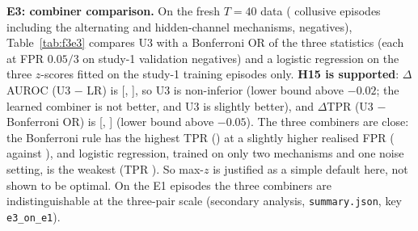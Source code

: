 \documentclass[11pt]{article}
\begin{document}
\textbf{E3: combiner comparison.} On the fresh $T{=}40$ data (\fEthreePos{} collusive episodes including the alternating and hidden-channel mechanisms, \fEthreeNeg{} negatives), Table~\ref{tab:f3e3} compares U3 with a Bonferroni OR of the three statistics (each at FPR $0.05/3$ on study-1 validation negatives) and a logistic regression on the three $z$-scores fitted on the \fEthreeLRTrain{} study-1 training episodes only. \textbf{H15 is supported}: $\Delta$AUROC (U3 $-$ LR) is \fEthreeDAuroc{} [\fEthreeDAurocLo{}, \fEthreeDAurocHi{}], so U3 is non-inferior (lower bound above $-0.02$; the learned combiner is not better, and U3 is slightly better), and $\Delta$TPR (U3 $-$ Bonferroni OR) is \fEthreeDTprBonf{} [\fEthreeDTprBonfLo{}, \fEthreeDTprBonfHi{}] (lower bound above $-0.05$). The three combiners are close: the Bonferroni rule has the highest TPR (\fEthreeTprBonf{}) at a slightly higher realised FPR (\fEthreeFprBonf{} against \fEthreeFprUthree{}), and logistic regression, trained on only two mechanisms and one noise setting, is the weakest (TPR \fEthreeTprLR{}). So max-$z$ is justified as a simple default here, not shown to be optimal. On the E1 episodes the three combiners are indistinguishable at the three-pair scale (secondary analysis, \texttt{summary.json}, key \texttt{e3\_on\_e1}).
\begin{table}[t]\centering\small\resizebox{\linewidth}{!}{}
\caption{E3: combiners on fresh $T{=}40$ episodes (all frozen from study 1; 95\% episode-bootstrap CIs; paired differences on identical episodes).}\label{tab:f3e3}\end{table}
\end{document}
